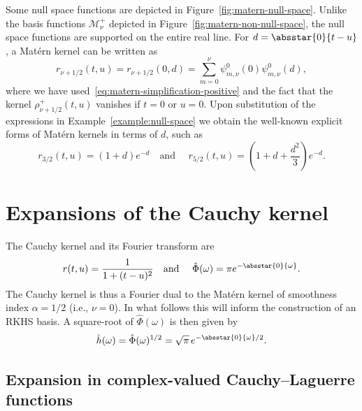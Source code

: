 \documentclass{article}
\begin{document}
Some null space functions are depicted in  Figure~\ref{fig:matern-null-space}.
Unlike the basis functions $\mathscr{M}_{\nu}^+$ depicted in 
Figure~\ref{fig:matern-non-null-space}, the null space functions are supported
on the entire real line. For $d = \absstar{0}{t - u}$, a Mat{\'e}rn kernel can
be written as
\[ r_{\nu + 1 / 2} (t, u) = r_{\nu + 1 / 2} (0, d) = \sum_{m = 0}^{\nu}
   \psi_{m, \nu}^0 (0) \psi_{m, \nu}^0 (d), \]
where we have used~\eqref{eq:matern-simplification-positive} and the fact that
the kernel $\rho_{\nu + 1 / 2}^+ (t, u)$ vanishes if $t = 0$ or $u = 0$. Upon
substitution of the expressions in  Example~\ref{example:null-space} we obtain
the well-known explicit forms of Mat{\'e}rn kernels in terms of $d$, such as
\[ r_{3 / 2} (t, u) = (1 + d) e^{- d}  \quad \text{and } \quad r_{5 / 2} (t,
   u) = \left( 1 + d + \frac{d^2}{3} \right) e^{- d} . \]
\section{Expansions of the Cauchy kernel}\label{sec:cauchy}

The Cauchy kernel and its Fourier transform are
\begin{equation}
  \label{eq:cauchy-kernel} r (t, u) = \frac{1}{1 + (t - u)^2}  \quad \text{and
  } \quad \hat{\Phi} (\omega) = \pi e^{- \absstar{0}{\omega}} .
\end{equation}
The Cauchy kernel is thus a Fourier dual to the Mat{\'e}rn kernel of
smoothness index $\alpha = 1 / 2$ (i.e., $\nu = 0$). In what follows this will
inform the construction of an RKHS basis. A square-root of $\hat{\Phi}
(\omega)$ is then given by
\begin{equation}
  \label{eq:h-cauchy} \hat{h} (\omega) = \hat{\Phi} (\omega)^{1 / 2} =
  \sqrt{\pi}  \hspace{0.17em} e^{- \absstar{0}{\omega} / 2} .
\end{equation}
\subsection{Expansion in complex-valued Cauchy--Laguerre
functions}\label{sec:cauchy-complex}
\end{document}
